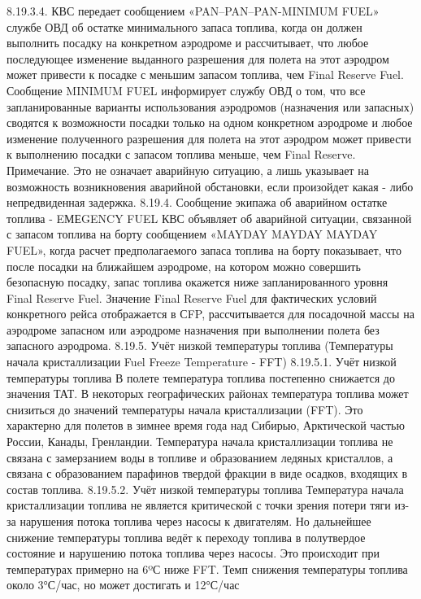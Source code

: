 8.19.3.4. КВС передает сообщением «PAN–PAN–PAN-MINIMUM FUEL» службе ОВД об остатке минимального запаса топлива, когда он должен выполнить посадку на конкретном аэродроме и рассчитывает, что любое последующее изменение выданного разрешения для полета на этот аэродром может привести к посадке с меньшим запасом топлива, чем Final Reserve Fuel.
Сообщение MINIMUM FUEL информирует службу ОВД о том, что все запланированные варианты использования аэродромов (назначения или запасных) сводятся к возможности посадки только на одном конкретном аэродроме и любое изменение полученного разрешения для полета на этот аэродром может привести к выполнению посадки с запасом топлива меньше, чем Final Reserve.
Примечание. Это не означает аварийную ситуацию, а лишь указывает на возможность возникновения аварийной обстановки, если произойдет какая - либо непредвиденная задержка.
8.19.4.	Сообщение экипажа об аварийном остатке топлива - EМЕGENCY FUEL
КВС объявляет об аварийной ситуации, связанной с запасом топлива на борту сообщением «MAYDAY MAYDAY MAYDAY FUEL», когда расчет предполагаемого запаса топлива на борту показывает, что после посадки на ближайшем аэродроме, на котором можно совершить безопасную посадку, запас топлива окажется ниже запланированного уровня Final Reserve Fuel.
Значение Final Reserve Fuel для фактических условий конкретного рейса отображается в СFP, рассчитывается для посадочной массы на аэродроме запасном или аэродроме назначения при выполнении полета без запасного аэродрома.
8.19.5.	Учёт низкой температуры топлива (Температуры начала кристаллизации Fuel Freeze Temperature - FFT)
8.19.5.1. Учёт низкой температуры топлива В полете температура топлива постепенно снижается до значения ТАТ. В некоторых географических районах температура топлива может снизиться до значений температуры начала кристаллизации (FFT). Это характерно для полетов в зимнее время года над Сибирью, Арктической частью России, Канады, Гренландии.
Температура начала кристаллизации топлива не связана с замерзанием воды в топливе и образованием ледяных кристаллов, а связана с образованием парафинов твердой фракции в виде осадков, входящих в состав топлива.
8.19.5.2. Учёт низкой температуры топлива Температура начала кристаллизации топлива не является критической с точки зрения потери тяги из-за нарушения потока топлива через насосы к двигателям. Но дальнейшее снижение температуры топлива ведёт к переходу топлива в полутвердое состояние и нарушению потока топлива через насосы. Это происходит при температурах примерно на 6ºС ниже FFT.
Темп снижения температуры топлива около 3°С/час, но может достигать и 12°С/час 
